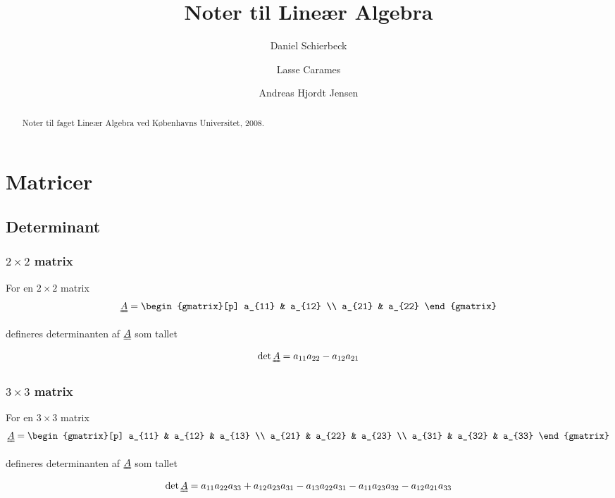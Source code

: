 \documentclass[a4paper]{article}
\title{Noter til Lineær Algebra}
\author{Daniel Schierbeck \and Lasse Carames \and Andreas Hjordt Jensen}
\newcommand{\mtx}[1]{\uuline{#1}}
\begin{document}
\maketitle

\begin{abstract}
Noter til faget Lineær Algebra ved Københavns Universitet, 2008.
\end{abstract}

\section{Matricer}

\subsection{Determinant}

\subsubsection{$2 \times 2$ matrix}

For en $2 \times 2$ matrix
$$
\mtx{A} =
\begin{gmatrix}[p]
    a_{11} & a_{12} \\
    a_{21} & a_{22}
\end{gmatrix}
$$

defineres determinanten af $\mtx{A}$ som tallet
$$
\det{\mtx{A}} = a_{11}a_{22} - a_{12}a_{21}
$$


\subsubsection{$3 \times 3$ matrix}

For en $3 \times 3$ matrix
$$
\mtx{A} =
\begin{gmatrix}[p]
    a_{11} & a_{12} & a_{13} \\
    a_{21} & a_{22} & a_{23} \\
    a_{31} & a_{32} & a_{33}
\end{gmatrix}
$$

defineres determinanten af $\mtx{A}$ som tallet
$$
\det{\mtx{A}} = a_{11}a_{22}a_{33} + a_{12}a_{23}a_{31} - a_{13}a_{22}a_{31} - a_{11}a_{23}a_{32} - a_{12}a_{21}a_{33}
$$
\end{document}
